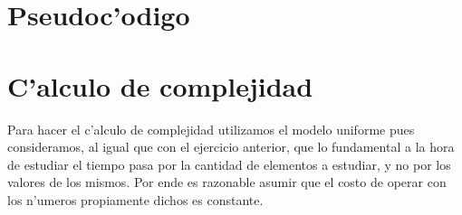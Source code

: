 \section{Pseudoc'odigo}


\section{C'alculo de complejidad}
Para hacer el c'alculo de complejidad utilizamos el modelo uniforme pues consideramos, al igual que con 
el ejercicio anterior, que lo fundamental a la hora de estudiar el tiempo pasa por la cantidad de elementos 
a estudiar, y no por los valores de los mismos. Por ende es razonable asumir que el costo de operar
con los n'umeros propiamente dichos es constante.\\

